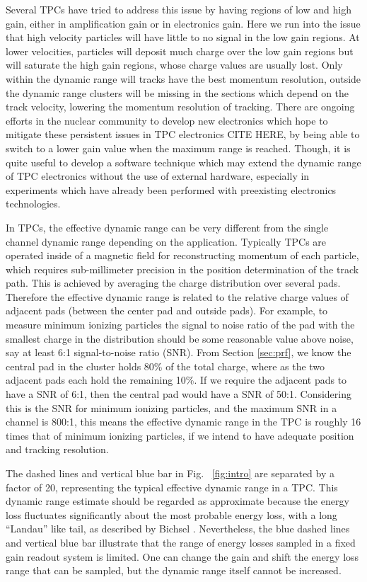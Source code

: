 Several TPCs have tried to address this issue by having regions of low and high gain, either in amplification gain or in electronics gain. Here we run into the issue that high velocity particles will have little to no signal in the low gain regions. At lower velocities, particles will deposit much charge over the low gain regions but will saturate the high gain regions, whose charge values are usually lost. Only within the dynamic range will tracks have the best momentum resolution, outside the dynamic range clusters will be missing in the sections which depend on the track velocity, lowering the momentum resolution of tracking. There are ongoing efforts in the nuclear community to develop new electronics which hope to mitigate these persistent issues in TPC electronics CITE HERE, by being able to switch to a lower gain value when the maximum range is reached. Though, it is quite useful to develop a software technique which may extend the dynamic range of TPC electronics without the use of external hardware, especially in experiments which have already been performed with preexisting electronics technologies. 

In TPCs, the effective dynamic range can be very different from the single channel dynamic range depending on the application. Typically TPCs are operated inside of a magnetic field for reconstructing momentum of each particle, which requires sub-millimeter precision in the position determination of the track path. This is achieved by averaging the charge distribution over several pads. Therefore the effective dynamic range is related to the relative charge values of adjacent pads (between the center pad and outside pads). For example, to measure minimum ionizing particles the signal to noise ratio of the pad with the smallest charge in the distribution should be some reasonable value above noise, say at least 6:1 signal-to-noise ratio (SNR). From Section \ref{sec:prf}, we know the central pad in the cluster holds 80\% of the total charge, where as the two adjacent pads each hold the remaining 10\%. If we require the adjacent pads to have a SNR of 6:1, then the central pad would have a SNR of 50:1. Considering this is the SNR for minimum ionizing particles, and the maximum SNR in a channel is 800:1, this means the effective dynamic range in the TPC is roughly 16 times that of minimum ionizing particles, if we intend to have adequate position and tracking resolution. 

The dashed lines and vertical blue bar in Fig.~ \ref{fig:intro} are separated by a factor of 20, representing the typical effective dynamic range in a TPC. This dynamic range estimate should be regarded as approximate because the energy loss fluctuates significantly about the most probable energy loss, with a long ``Landau'' like tail, as described by Bichsel \cite{bichsel}. Nevertheless, the blue dashed lines and vertical blue bar illustrate that the range of energy losses sampled in a fixed gain readout system is limited. One can change the gain and shift the energy loss range that can be sampled, but the dynamic range itself cannot be increased.

